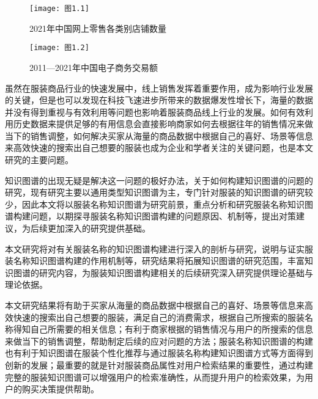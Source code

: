 \documentclass[bachelor_p]{hdu-thesis}
\begin{document}
\begin{figure}[h]
  \centering
  \texttt{[image: 图1.1]}
  \caption{2021年中国网上零售各类别店铺数量\cite{book1}} \label{fig:graph.01}
\end{figure}

\begin{figure}[h]
  \centering
  \texttt{[image: 图1.2]}
  \caption{2011—2021年中国电子商务交易额\cite{book2}} \label{fig:graph.02}
\end{figure}

虽然在服装商品行业的快速发展中，线上销售发挥着重要作用，成为影响行业发展的关键，但是也可以发现在科技飞速进步所带来的数据爆发性增长下，海量的数据并没有得到重视与有效利用等问题也影响着服装商品线上行业的发展。如何有效利用历史数据来提供足够的有用信息会直接影响商家如何去根据往年的销售情况来做当下的销售调整，如何解决买家从海量的商品数据中根据自己的喜好、场景等信息来高效快速的搜索出自己想要的服装也成为企业和学者关注的关键问题，也是本文研究的主要问题。

知识图谱的出现无疑是解决这一问题的极好办法，关于如何构建知识图谱的问题的研究，现有研究主要以通用类型知识图谱为主，专门针对服装的知识图谱的研究较少，因此本文将以服装名称知识图谱为研究前景，重点分析和研究服装名称知识图谱构建问题，以期探寻服装名称知识图谱构建的问题原因、机制等，提出对策建议，为后续更加深入的研究提供基础。


本文研究将对有关服装名称的知识图谱构建进行深入的剖析与研究，说明与证实服装名称知识图谱构建的作用机制等，研究结果将拓展知识图谱的研究范围，丰富知识图谱的研究内容，为服装知识图谱构建相关的后续研究深入研究提供理论基础与理论依据。


本文研究结果将有助于买家从海量的商品数据中根据自己的喜好、场景等信息来高效快速的搜索出自己想要的服装，满足自己的消费需求，根据自己所搜索的服装名称得知自己所需要的相关信息；有利于商家根据的销售情况与用户的所搜索的信息来做当下的销售调整，帮助制定后续的应对问题的方法；服装名称知识图谱的构建也有利于知识图谱在服装个性化推荐与通过服装名称构建知识图谱方式等方面得到创新的发展；最重要的就是针对服装商品属性对用户检索结果的重要性，通过构建完整的服装知识图谱可以增强用户的检索准确性，从而提升用户的检索效果，为用户的购买决策提供帮助。
\end{document}
